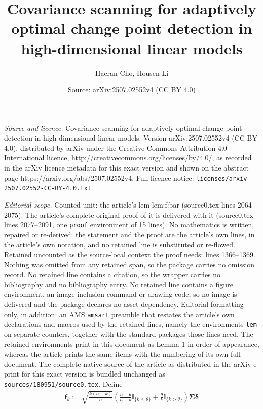 \documentclass[10pt,a4paper]{amsart}
\title{Covariance scanning for adaptively optimal change point detection in high-dimensional linear models}
\author{Haeran Cho, Housen Li}
\date{Source: arXiv:2507.02552v4 (CC BY 4.0)}
\newcommand{\cp}{\theta}
\renewcommand{\l}{\left}
\newcommand{\mbf}{\mathbf}
\renewcommand{\r}{\right}
\begin{document}
\maketitle

\noindent\emph{Source and licence.} Covariance scanning for adaptively optimal change point detection in high-dimensional linear models. Version arXiv:2507.02552v4 (CC BY 4.0), distributed by arXiv under the Creative Commons Attribution 4.0 International licence, http://creativecommons.org/licenses/by/4.0/, as recorded in the arXiv licence metadata for this exact version and shown on the abstract page https://arxiv.org/abs/2507.02552v4. Full licence notice: \texttt{licenses/arxiv-2507.02552-CC-BY-4.0.txt}.\par\smallskip

\noindent\textit{Editorial scope.} Counted unit: the article's lem lem:f:bar (source0.tex lines 2064--2075). The article's complete original proof of it is delivered with it (source0.tex lines 2077--2091, one \texttt{proof} environment of 15 lines). No mathematics is written, repaired or re-derived: the statement and the proof are the article's own lines, in the article's own notation, and no retained line is substituted or re-flowed.  Retained uncounted as the source-local context the proof needs: lines 1366--1369.  Nothing was omitted from any retained span, so the package carries no omission record.  No retained line contains a citation, so the wrapper carries no bibliography and no bibliography entry.  No retained line contains a figure environment, an image-inclusion command or drawing code, so no image is delivered and the package declares no asset dependency.  Editorial formatting only, in addition: an AMS \texttt{amsart} preamble that restates the article's own declarations and macros used by the retained lines, namely the environments \texttt{lem} on separate counters, together with the standard packages those lines need.  The retained environments print in this document as Lemma 1 in order of appearance, whereas the article prints the same items with the numbering of its own full document.  The complete native source of the article as distributed in the arXiv e-print for this exact version is bundled unchanged as \texttt{sources/180951/source0.tex}.
Define \begin{align}
\bar{\mbf f}_k := \sqrt{\frac{k (n - k)}{n}} \l( \frac{n - \cp}{n - k} \mathbb{I}_{\{k \le \cp\}} + \frac{\cp}{k} \mathbb{I}_{\{k > \cp\}} \r) \bm\Sigma \bm\delta
\label{eq:f:bar}
\end{align}
\end{document}
